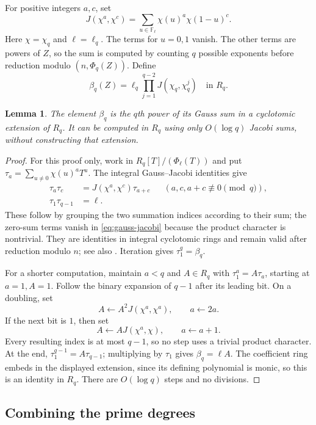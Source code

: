 \documentclass[11pt]{article}
\newtheorem{lemma}[theorem]{Lemma}
\theoremstyle{definition}
\theoremstyle{remark}
\newcommand{\F}{\mathbb F}
\begin{document}
For positive integers $a,c$, set
\[
 J(\chi^a,\chi^c)=
 \sum_{u\in\F_\ell}\chi(u)^a\chi(1-u)^c.
\]
Here $\chi=\chi_q$ and $\ell=\ell_q$. The terms for $u=0,1$
vanish. The other terms are powers of $Z$, so the sum is computed
by counting $q$ possible exponents before reduction modulo
$(n,\Phi_q(Z))$. Define
\begin{equation}\label{eq:beta}
 \beta_q(Z)=\ell_q\prod_{j=1}^{q-2}J(\chi_q,\chi_q^j)
       \quad\text{in }R_q.
\end{equation}

\begin{lemma}\label{lem:jacobi}
The element $\beta_q$ is the $q$th power of its Gauss sum in a
cyclotomic extension of $R_q$. It can be computed in $R_q$ using
only $O(\log q)$ Jacobi sums, without constructing that extension.
\end{lemma}

\begin{proof}
For this proof only, work in $R_q[T]/(\Phi_\ell(T))$ and put
$\tau_a=\sum_{u\ne0}\chi(u)^aT^u$. The integral Gauss--Jacobi
identities give
\begin{align}
 \tau_a\tau_c&=J(\chi^a,\chi^c)\tau_{a+c}
          &&(a,c,a+c\not\equiv0\pmod q),\label{eq:gauss-jacobi}\\
 \tau_1\tau_{q-1}&=\ell.\label{eq:gauss-unit}
\end{align}
These follow by grouping the two summation indices according to
their sum; the zero-sum terms vanish in \eqref{eq:gauss-jacobi}
because the product character is nontrivial. They are identities
in integral cyclotomic rings and remain valid after reduction
modulo $n$; see also \cite[Theorem 2.4]{conrad}. Iteration gives
$\tau_1^q=\beta_q$.

For a shorter computation, maintain $a<q$ and $A\in R_q$ with
$\tau_1^a=A\tau_a$, starting at $a=1,A=1$. Follow the binary
expansion of $q-1$ after its leading bit. On a doubling, set
\[
 A\longleftarrow A^2J(\chi^a,\chi^a),\qquad
 a\longleftarrow2a.
\]
If the next bit is $1$, then set
\[
 A\longleftarrow A J(\chi^a,\chi),\qquad
 a\longleftarrow a+1.
\]
Every resulting index is at most $q-1$, so no step uses a
trivial product character. At the end,
$\tau_1^{q-1}=A\tau_{q-1}$; multiplying by $\tau_1$ gives
$\beta_q=\ell A$. The coefficient ring embeds in the displayed
extension, since its defining polynomial is monic, so this is an
identity in $R_q$. There are $O(\log q)$ steps and no divisions.
\end{proof}

\subsection{Combining the prime degrees}
\end{document}
